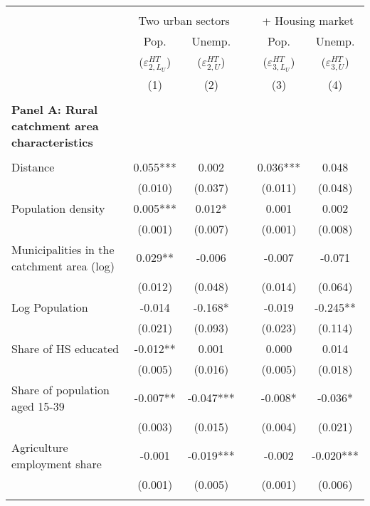 \begin{tabular}{lccccc}
\toprule &       &       &       &       &  \\
      & \multicolumn{2}{c}{Two urban sectors} &       & \multicolumn{2}{c}{+ Housing market} \bigstrut[b]\\
\cline{2-3}\cline{5-6}      & Pop.  & Unemp. &       & Pop.  & Unemp. \bigstrut[t]\\
      & ($\varepsilon_{2,L_{U}}^{HT}$) &  ($\varepsilon_{2,U}^{HT}$) &       & ($\varepsilon_{3,L_{U}}^{HT}$) &  ($\varepsilon_{3,U}^{HT}$) \\
      & (1)   & (2)   &       & (3)   & (4) \bigstrut[b]\\
\cline{2-6}      &       &       &       &       &  \bigstrut[t]\\
\textbf{Panel A: Rural catchment area characteristics} &       &       &       &       &  \\
      &       &       &       &       &  \\
Distance & 0.055*** & 0.002 &       & 0.036*** & 0.048 \\
      & (0.010) & (0.037) &       & (0.011) & (0.048) \\
Population density & 0.005*** & 0.012* &       & 0.001 & 0.002 \\
      & (0.001) & (0.007) &       & (0.001) & (0.008) \\
Municipalities in the catchment area (log) & 0.029** & -0.006 &       & -0.007 & -0.071 \\
      & (0.012) & (0.048) &       & (0.014) & (0.064) \\
Log Population & -0.014 & -0.168* &       & -0.019 & -0.245** \\
      & (0.021) & (0.093) &       & (0.023) & (0.114) \\
Share of HS educated & -0.012** & 0.001 &       & 0.000 & 0.014 \\
      & (0.005) & (0.016) &       & (0.005) & (0.018) \\
Share of population aged 15-39 & -0.007** & -0.047*** &       & -0.008* & -0.036* \\
      & (0.003) & (0.015) &       & (0.004) & (0.021) \\
Agriculture employment share & -0.001 & -0.019*** &       & -0.002 & -0.020*** \\
      & (0.001) & (0.005) &       & (0.001) & (0.006) \\
      &       &       &       &       &  \\

\end{tabular}
